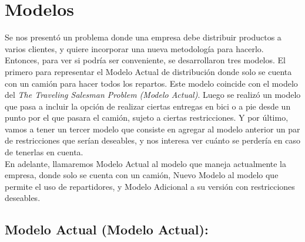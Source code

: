 \documentclass{article}
\begin{document}
    
    
    
    \maketitle
    
    \newpage
    
    \section{Modelos}
    Se nos presentó un problema donde una empresa debe distribuir productos a varios clientes, y quiere incorporar una nueva metodología para hacerlo. Entonces, para ver si podría ser conveniente, se desarrollaron tres modelos. El primero para representar el Modelo Actual de distribución donde solo se cuenta con un camión para hacer todos los repartos. Este modelo coincide con el modelo del \textit{The Traveling Salesman Problem (Modelo Actual)}. Luego se realizó un modelo que pasa a incluir la opción de realizar ciertas entregas en bici o a pie desde un punto por el que pasara el camión, sujeto a ciertas restricciones. Y por último, vamos a tener un tercer modelo que consiste en agregar al modelo anterior un par de restricciones que serían deseables, y nos interesa ver cuánto se perdería en caso de tenerlas en cuenta. \\
    En adelante, llamaremos Modelo Actual al modelo que maneja actualmente la empresa, donde solo se cuenta con un camión, Nuevo Modelo al modelo que permite el uso de repartidores, y Modelo Adicional a su versión con restricciones deseables.
    
    \subsection{Modelo Actual (Modelo Actual):} \label{modelo_actual}
\end{document}
